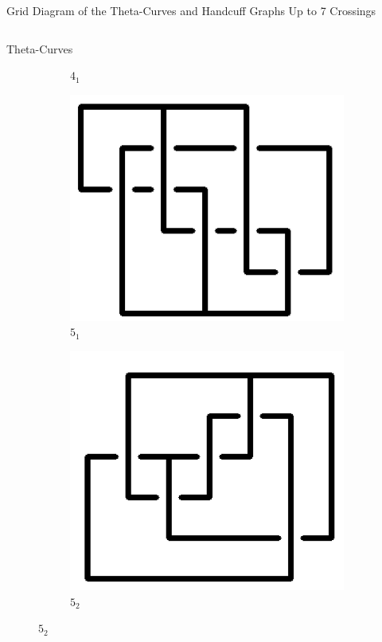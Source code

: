 \documentclass[final]{beamer}
\begin{document}
\begin{frame}[t]
\begin{alertblock}{Grid Diagram of the Theta-Curves and Handcuff Graphs Up to 7 Crossings}
\begin{columns}[t]
\begin{column}{0.5\textwidth}
\begin{alertblock}{Theta-Curves}
\begin{figure}
\begin{subfigure}{0.075\textwidth}
    \caption{$4_1$} 
    \end{subfigure}
    \begin{subfigure}{0.075\textwidth}
    \includegraphics[width=\columnwidth]{../Midterm_Poster/grid_diagram/theta_5_1.png}
    \caption{$5_1$}
    \end{subfigure}
    \begin{subfigure}{0.075\textwidth}
    \includegraphics[width=\columnwidth]{../Midterm_Poster/grid_diagram/theta_5_2.png}
    \caption{$5_2$} 

\end{subfigure}
\end{figure}
\end{alertblock}
\end{column}
\end{columns}
\end{alertblock}
\end{frame}
\end{document}
